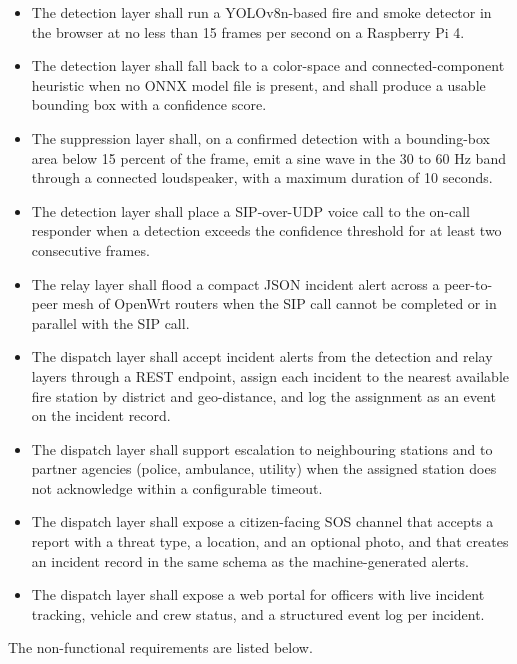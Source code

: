 \begin{itemize}
\item The detection layer shall run a YOLOv8n-based fire and smoke detector in the browser at no less than 15 frames per second on a Raspberry Pi 4.
\item The detection layer shall fall back to a color-space and connected-component heuristic when no ONNX model file is present, and shall produce a usable bounding box with a confidence score.
\item The suppression layer shall, on a confirmed detection with a bounding-box area below 15 percent of the frame, emit a sine wave in the 30 to 60 Hz band through a connected loudspeaker, with a maximum duration of 10 seconds.
\item The detection layer shall place a SIP-over-UDP voice call to the on-call responder when a detection exceeds the confidence threshold for at least two consecutive frames.
\item The relay layer shall flood a compact JSON incident alert across a peer-to-peer mesh of OpenWrt routers when the SIP call cannot be completed or in parallel with the SIP call.
\item The dispatch layer shall accept incident alerts from the detection and relay layers through a REST endpoint, assign each incident to the nearest available fire station by district and geo-distance, and log the assignment as an event on the incident record.
\item The dispatch layer shall support escalation to neighbouring stations and to partner agencies (police, ambulance, utility) when the assigned station does not acknowledge within a configurable timeout.
\item The dispatch layer shall expose a citizen-facing SOS channel that accepts a report with a threat type, a location, and an optional photo, and that creates an incident record in the same schema as the machine-generated alerts.
\item The dispatch layer shall expose a web portal for officers with live incident tracking, vehicle and crew status, and a structured event log per incident.
\end{itemize}

The non-functional requirements are listed below.

